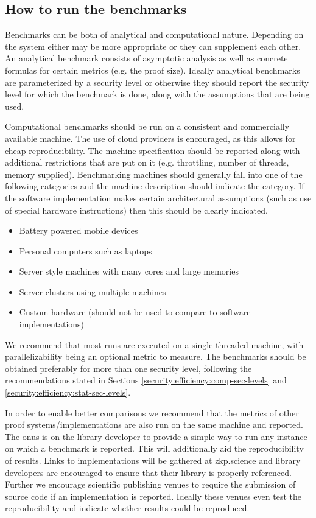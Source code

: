 \subsection{How to run the benchmarks}
Benchmarks can be both of analytical and computational nature. Depending on the system either may be more appropriate or they can supplement each other. An analytical benchmark consists of asymptotic analysis as well as concrete formulas for certain metrics (e.g. the proof size). Ideally analytical benchmarks are parameterized by a security level or otherwise they should report the security level for which the benchmark is done, along with the assumptions that are being used.

Computational benchmarks should be run on a consistent and commercially available machine. The use of cloud providers is encouraged, as this allows for cheap reproducibility. The machine specification should be reported along with additional restrictions that are put on it (e.g. throttling, number of threads, memory supplied). Benchmarking machines should generally fall into one of the following categories and the machine description should indicate the category. If the software implementation makes certain architectural assumptions (such as use of special hardware instructions) then this should be clearly indicated.

\begin{itemize}
    \item Battery powered mobile devices
    \item Personal computers such as laptops
    \item Server style machines with many cores and large memories
    \item Server clusters using multiple machines 
    \item Custom hardware (should not be used to compare to software implementations)
\end{itemize}


We recommend that most runs are executed on a single-threaded machine, with parallelizability being an optional metric to measure. 
	The benchmarks should be
	obtained preferably for more than one security level, following the recommendations stated in Sections \ref{security:efficiency:comp-sec-levels} and \ref{security:efficiency:stat-sec-levels}.


In order to enable better comparisons we recommend that the metrics of other proof systems\slash implementations are also run on the same machine and reported. The onus is on the library developer to provide a simple way to run any instance on which a benchmark is reported.   This will additionally aid the reproducibility of results. Links to implementations will be gathered at zkp.science and library developers are encouraged to ensure that their library is properly referenced. Further we encourage scientific publishing venues to require the submission of source code if an implementation is reported. Ideally these venues even test the reproducibility and indicate whether results could be reproduced.


